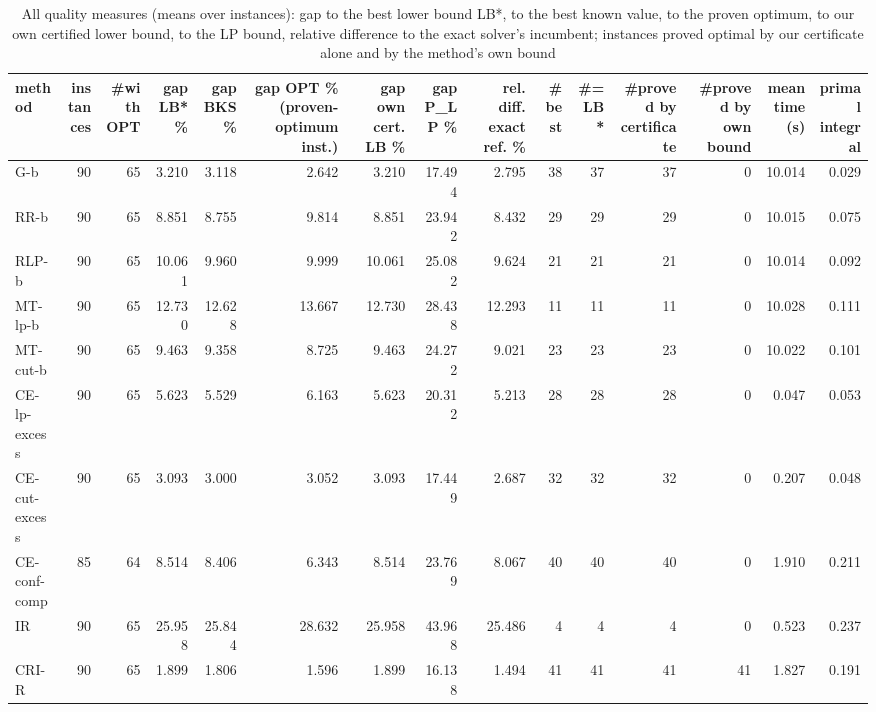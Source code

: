 \begin{table}[htbp]
\centering
\small
\caption{All quality measures (means over instances): gap to the best lower bound LB*, to the best known value, to the proven optimum, to our own certified lower bound, to the LP bound, relative difference to the exact solver's incumbent; instances proved optimal by our certificate alone and by the method's own bound}
\label{tab:E2b_head_to_head_budgets_b10_all_metrics}
\begin{tabular}{lrrrrrrrrrrrrrr}
\toprule
method & instances & \#with OPT & gap LB* \% & gap BKS \% & gap OPT \% (proven-optimum inst.) & gap own cert. LB \% & gap P\_LP \% & rel. diff. exact ref. \% & \#best & \#= LB* & \#proved by certificate & \#proved by own bound & mean time (s) & primal integral \\
\midrule
G-b & 90 & 65 & 3.210 & 3.118 & 2.642 & 3.210 & 17.494 & 2.795 & 38 & 37 & 37 & 0 & 10.014 & 0.029 \\
RR-b & 90 & 65 & 8.851 & 8.755 & 9.814 & 8.851 & 23.942 & 8.432 & 29 & 29 & 29 & 0 & 10.015 & 0.075 \\
RLP-b & 90 & 65 & 10.061 & 9.960 & 9.999 & 10.061 & 25.082 & 9.624 & 21 & 21 & 21 & 0 & 10.014 & 0.092 \\
MT-lp-b & 90 & 65 & 12.730 & 12.628 & 13.667 & 12.730 & 28.438 & 12.293 & 11 & 11 & 11 & 0 & 10.028 & 0.111 \\
MT-cut-b & 90 & 65 & 9.463 & 9.358 & 8.725 & 9.463 & 24.272 & 9.021 & 23 & 23 & 23 & 0 & 10.022 & 0.101 \\
CE-lp-excess & 90 & 65 & 5.623 & 5.529 & 6.163 & 5.623 & 20.312 & 5.213 & 28 & 28 & 28 & 0 & 0.047 & 0.053 \\
CE-cut-excess & 90 & 65 & 3.093 & 3.000 & 3.052 & 3.093 & 17.449 & 2.687 & 32 & 32 & 32 & 0 & 0.207 & 0.048 \\
CE-conf-comp & 85 & 64 & 8.514 & 8.406 & 6.343 & 8.514 & 23.769 & 8.067 & 40 & 40 & 40 & 0 & 1.910 & 0.211 \\
IR & 90 & 65 & 25.958 & 25.844 & 28.632 & 25.958 & 43.968 & 25.486 & 4 & 4 & 4 & 0 & 0.523 & 0.237 \\
CRI-R & 90 & 65 & 1.899 & 1.806 & 1.596 & 1.899 & 16.138 & 1.494 & 41 & 41 & 41 & 41 & 1.827 & 0.191 \\
\bottomrule
\end{tabular}
\end{table}
